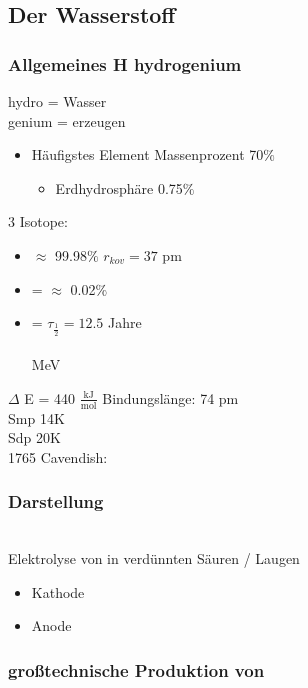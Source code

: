 \documentclass{article}
\begin{document}
\subsection{Der Wasserstoff}
\subsubsection{Allgemeines H hydrogenium}
hydro = Wasser\\
genium = erzeugen\\
\begin{itemize}
    \item Häufigstes Element Massenprozent 70$\%$
    \begin{itemize}
        \item Erdhydrosphäre 0.75$\%$
    \end{itemize}
\end{itemize}
3 Isotope:
\begin{itemize}
    \item {} $\approx$ 99.98$\%$ $r_{kov}=37$ pm
    \item {} =  $\approx$ 0.02$\%$
    \item {} =  $\tau_{\frac{1}{2}} = 12.5$ Jahre\\ \\  MeV
\end{itemize}
 $\Delta$ E = 440 $\frac{\mathrm{kJ}}{\mathrm{mol}}$ Bindungslänge: 74 pm\\
Smp 14K\\
Sdp 20K\\
1765 Cavendish:\\
\subsubsection{Darstellung}
\\
Elektrolyse von  in verdünnten Säuren / Laugen\\
\begin{itemize}
    \item Kathode 
    \item Anode 
\end{itemize}
\subsubsection{großtechnische Produktion von }
\end{document}
